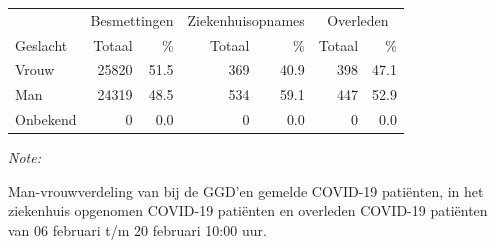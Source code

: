 \documentclass[
  english,
  man,floatsintext]{apa6}
\begin{document}
\begin{table}[H]
\centering\begingroup\fontsize{11}{13}\selectfont

\begin{threeparttable}
\begin{tabular}{lrrrrrr}
\toprule
\multicolumn{1}{c}{ } & \multicolumn{2}{c}{Besmettingen} & \multicolumn{2}{c}{Ziekenhuisopnames} & \multicolumn{2}{c}{Overleden} \\
\cmidrule(l{3pt}r{3pt}){2-3} \cmidrule(l{3pt}r{3pt}){4-5} \cmidrule(l{3pt}r{3pt}){6-7}
Geslacht & Totaal & \% & Totaal & \% & Totaal & \%\\
\midrule
Vrouw & 25820 & 51.5 & 369 & 40.9 & 398 & 47.1\\
Man & 24319 & 48.5 & 534 & 59.1 & 447 & 52.9\\
Onbekend & 0 & 0.0 & 0 & 0.0 & 0 & 0.0\\
\bottomrule
\end{tabular}
\begin{tablenotes}
\item \textit{Note: } 
\item Man-vrouwverdeling van bij de GGD’en gemelde COVID-19 patiënten, in het ziekenhuis opgenomen COVID-19 patiënten en overleden COVID-19 patiënten van 06 februari t/m 20 februari 10:00 uur.
\end{tablenotes}
\end{threeparttable}
\endgroup{}
\end{table}
\newpage
\end{document}
